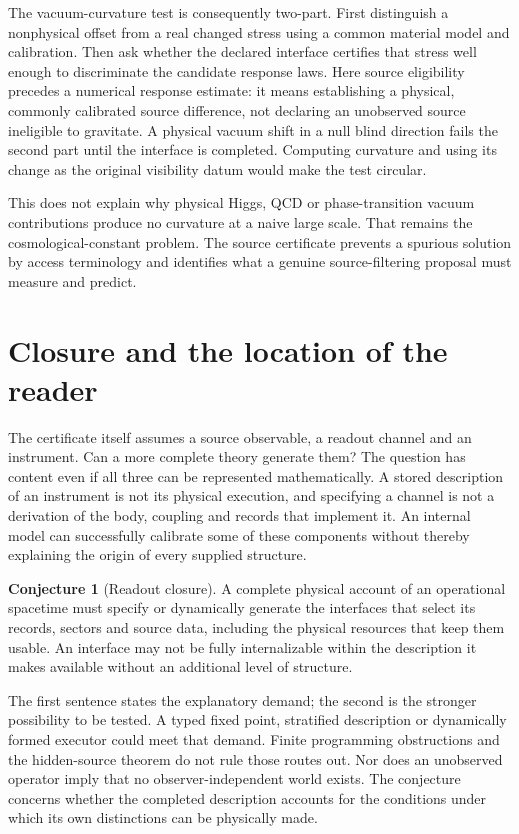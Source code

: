 \documentclass[12pt,a4paper]{article}
\theoremstyle{definition}
\newtheorem{conjecture}[theorem]{Conjecture}
\begin{document}
The vacuum-curvature test is consequently two-part. First distinguish a
nonphysical offset from a real changed stress using a common material
model and calibration. Then ask whether the declared interface certifies
that stress well enough to discriminate the candidate response laws.
Here source eligibility precedes a numerical response estimate: it means
establishing a physical, commonly calibrated source difference, not
declaring an unobserved source ineligible to gravitate.
A physical vacuum shift in a null blind direction fails the second part
until the interface is completed. Computing curvature and using its
change as the original visibility datum would make the test circular.

This does not explain why physical Higgs, QCD or phase-transition vacuum
contributions produce no curvature at a naive large scale. That remains
the cosmological-constant problem. The source certificate prevents a
spurious solution by access terminology and identifies what a genuine
source-filtering proposal must measure and predict.

\section{Closure and the location of the reader}
\label{sec:closure}

The certificate itself assumes a source observable, a readout channel and
an instrument. Can a more complete theory generate them? The question
has content even if all three can be represented mathematically. A
stored description of an instrument is not its physical execution, and
specifying a channel is not a derivation of the body, coupling and records
that implement it. An internal model can successfully calibrate some of
these components without thereby explaining the origin of every supplied
structure.

\begin{conjecture}[Readout closure]
A complete physical account of an operational spacetime must specify or
dynamically generate the interfaces that select its records, sectors and
source data, including the physical resources that keep them usable.
An interface may not be fully internalizable within the description it
makes available without an additional level of structure.
\end{conjecture}

The first sentence states the explanatory demand; the second is the
stronger possibility to be tested. A typed fixed point, stratified
description or dynamically formed executor could meet that demand.
Finite programming obstructions and the hidden-source theorem do not
rule those routes out. Nor does an unobserved operator imply that no
observer-independent world exists. The conjecture concerns whether the
completed description accounts for the conditions under which its own
distinctions can be physically made.
\end{document}
